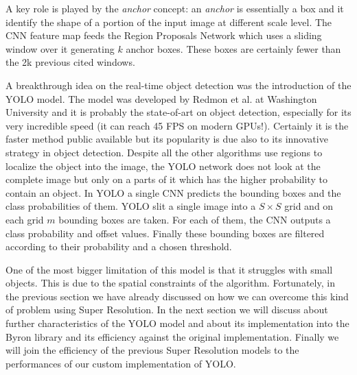 \documentclass{standalone}
\begin{document}
A key role is played by the \emph{anchor} concept: an \emph{anchor} is essentially a box and it identify the shape of a portion of the input image at different scale level.
The CNN feature map feeds the Region Proposals Network which uses a sliding window over it generating $k$ anchor boxes.
These boxes are certainly fewer than the 2k previous cited windows.

A breakthrough idea on the real-time object detection was the introduction of the YOLO model.
The model was developed by Redmon et al. at Washington University and it is probably the state-of-art on object detection, especially for its very incredible speed (it can reach 45 FPS on modern GPUs!).
Certainly it is the faster method public available but its popularity is due also to its innovative strategy in object detection.
Despite all the other algorithms use regions to localize the object into the image, the YOLO network does not look at the complete image but only on a parts of it which has the higher probability to contain an object.
In YOLO a single CNN predicts the bounding boxes and the class probabilities of them.
YOLO slit a single image into a $S\times S$ grid and on each grid $m$ bounding boxes are taken.
For each of them, the CNN outputs a class probability and offset values.
Finally these bounding boxes are filtered according to their probability and a chosen threshold.

One of the most bigger limitation of this model is that it struggles with small objects.
This is due to the spatial constraints of the algorithm.
Fortunately, in the previous section we have already discussed on how we can overcome this kind of problem using Super Resolution.
In the next section we will discuss about further characteristics of the YOLO model and about its implementation into the Byron library and its efficiency against the original implementation.
Finally we will join the efficiency of the previous Super Resolution models to the performances of our custom implementation of YOLO.


\end{document}
